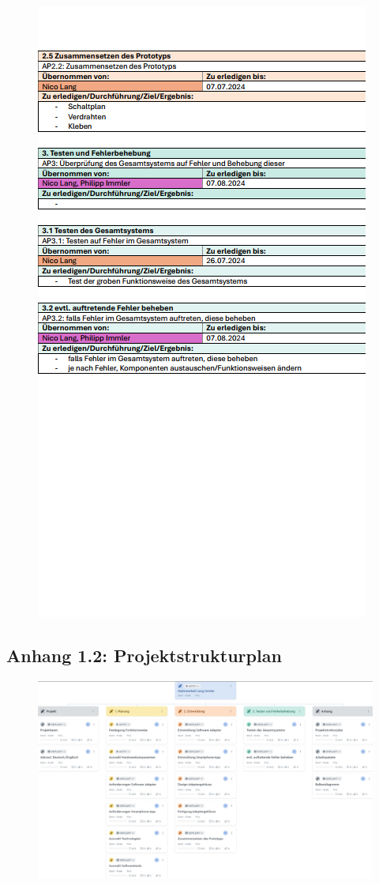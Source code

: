 \documentclass[11pt, twoside]{article}
\begin{document}
\begin{figure}[H]  
    \centering
    \includegraphics[height=\textheight]{ap_3.png}
\end{figure}
\subsection{Anhang 1.2: Projektstrukturplan}
\begin{figure}[H]  
    \centering
    \includegraphics[width=\textheight, angle=90]{PSP_final.png}
\end{figure}
\end{document}
